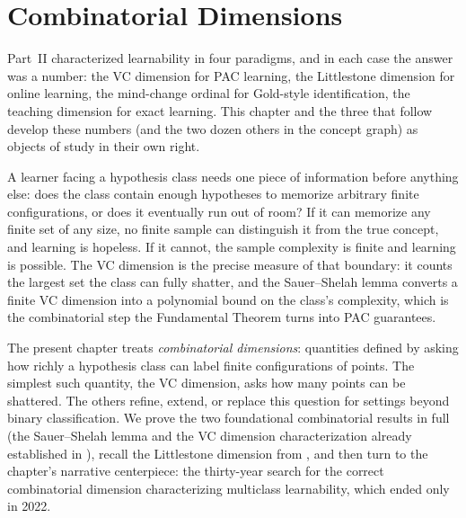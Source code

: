 
\chapter{Combinatorial Dimensions}
\label{ch:dimensions}

Part~II characterized learnability in four paradigms, and in each case the
answer was a number: the VC dimension for PAC learning, the Littlestone
dimension for online learning, the mind-change ordinal for Gold-style
identification, the teaching dimension for exact learning.  This chapter and
the three that follow develop these numbers (and the two dozen others in the
concept graph) as objects of study in their own right.

A learner facing a hypothesis class needs one piece of information before
anything else: does the class contain enough hypotheses to memorize arbitrary
finite configurations, or does it eventually run out of room?  If it can
memorize any finite set of any size, no finite sample can distinguish it from
the true concept, and learning is hopeless.  If it cannot, the sample
complexity is finite and learning is possible.  The VC dimension is the
precise measure of that boundary: it counts the largest set the class can
fully shatter, and the Sauer--Shelah lemma converts a finite VC dimension
into a polynomial bound on the class's complexity, which is the combinatorial
step the Fundamental Theorem turns into PAC guarantees.

The present chapter treats \emph{combinatorial dimensions}: quantities defined
by asking how richly a hypothesis class can label finite configurations of
points.  The simplest such quantity, the VC dimension, asks how many points
can be shattered.  The others refine, extend, or replace this question for
settings beyond binary classification.  We prove the two foundational
combinatorial results in full (the Sauer--Shelah lemma and the
VC dimension characterization already established in ), recall the
Littlestone dimension from , and then turn to the chapter's
narrative centerpiece: the thirty-year search for the correct combinatorial
dimension characterizing multiclass learnability, which ended only in 2022.

\medskip

